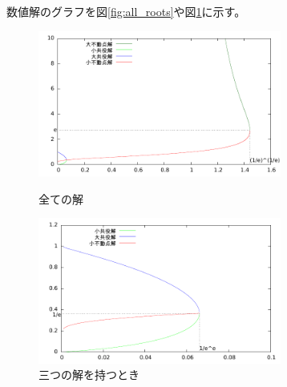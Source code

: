 	数値解のグラフを図\ref{fig:all_roots}や図\ref{fig:three_roots}に示す。
	\begin{figure}[hbtp]
	\begin{minipage}{0.5\hsize}
		\includegraphics[width=80mm]{../plot/graph/all_roots.pdf}
		\caption{全ての解}
		\label{fig:all_roots}
	\end{minipage}
	\begin{minipage}{0.5\hsize}
		\includegraphics[width=80mm]{../plot/graph/three_roots.pdf}
		\caption{三つの解を持つとき}
		\label{fig:three_roots}
	\end{minipage}
	\end{figure}
	

